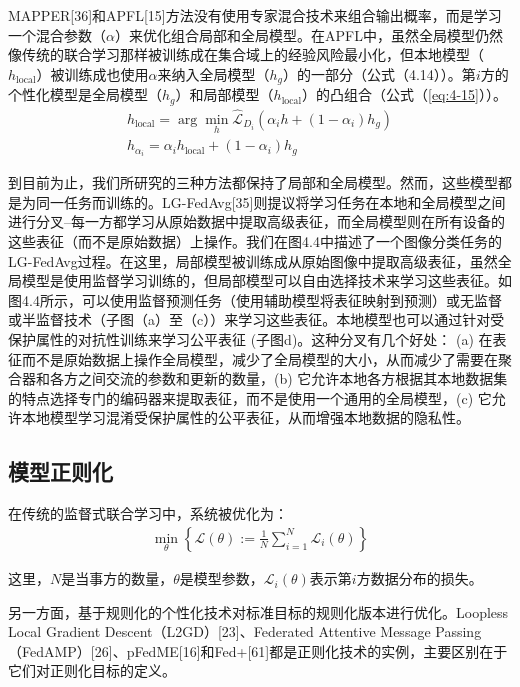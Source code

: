 MAPPER[36]和APFL[15]方法没有使用专家混合技术来组合输出概率，而是学习一个混合参数（$\alpha$）来优化组合局部和全局模型。在APFL中，虽然全局模型仍然像传统的联合学习那样被训练成在集合域上的经验风险最小化，但本地模型（$h_{\text{local}}$）被训练成也使用$\alpha$来纳入全局模型（$h_{g}$）的一部分（公式（4.14））。第$i$方的个性化模型是全局模型（$h_{g}$）和局部模型（$h_{\text{local}}$）的凸组合（公式（\ref{eq:4-15}））。
\begin{align}
	h_{\text{local}} = \arg \min_{h} \hat{\mathcal{L}}_{D_{i}} (\alpha_{i}h + (1-\alpha_{i})h_{g})	\label{eq:4-14} \\
	h_{\alpha_{i}} = \alpha_{i}h_{\text{local}} + (1 - \alpha_{i})h_{g}	\label{eq:4-15}
\end{align}

到目前为止，我们所研究的三种方法都保持了局部和全局模型。然而，这些模型都是为同一任务而训练的。LG-FedAvg[35]则提议将学习任务在本地和全局模型之间进行分叉--每一方都学习从原始数据中提取高级表征，而全局模型则在所有设备的这些表征（而不是原始数据）上操作。我们在图4.4中描述了一个图像分类任务的LG-FedAvg过程。在这里，局部模型被训练成从原始图像中提取高级表征，虽然全局模型是使用监督学习训练的，但局部模型可以自由选择技术来学习这些表征。如图4.4所示，可以使用监督预测任务（使用辅助模型将表征映射到预测）或无监督或半监督技术（子图（a）至（c））来学习这些表征。本地模型也可以通过针对受保护属性的对抗性训练来学习公平表征  (子图d)。这种分叉有几个好处： (a) 在表征而不是原始数据上操作全局模型，减少了全局模型的大小，从而减少了需要在聚合器和各方之间交流的参数和更新的数量，(b) 它允许本地各方根据其本地数据集的特点选择专门的编码器来提取表征，而不是使用一个通用的全局模型，(c) 它允许本地模型学习混淆受保护属性的公平表征，从而增强本地数据的隐私性。

\subsection{模型正则化}
在传统的监督式联合学习中，系统被优化为：
\begin{align}\label{eq:4-16}
	\min_{\theta} \left\{ \mathcal{L}(\theta) := \frac{1}{N} \sum_{i=1}^{N} \mathcal{L}_{i}(\theta) \right\}
\end{align}

这里，$N$是当事方的数量，$\theta$是模型参数，$\mathcal{L}_{i}(\theta)$表示第$i$方数据分布的损失。

另一方面，基于规则化的个性化技术对标准目标的规则化版本进行优化。Loopless Local Gradient Descent（L2GD）[23]、Federated Attentive Message Passing（FedAMP）[26]、pFedME[16]和Fed+[61]都是正则化技术的实例，主要区别在于它们对正则化目标的定义。

